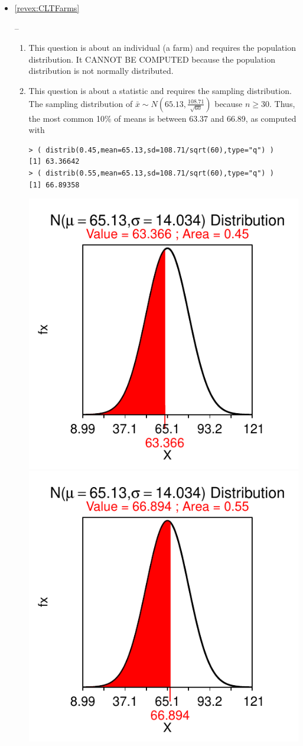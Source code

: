 \documentclass[10pt,openany]{book}\usepackage[]{graphicx}\usepackage[]{color}
\makeatletter
\newenvironment{kframe}{%
 \def\at@end@of@kframe{}%
 \ifinner\ifhmode%
  \def\at@end@of@kframe{\end{minipage}}%
  \begin{minipage}{\columnwidth}%
 \fi\fi%
 \def\FrameCommand##1{\hskip\@totalleftmargin \hskip-\fboxsep
 \colorbox{shadecolor}{##1}\hskip-\fboxsep
     \hskip-\linewidth \hskip-\@totalleftmargin \hskip\columnwidth}%
 \MakeFramed {\advance\hsize-\width
   \@totalleftmargin\z@ \linewidth\hsize
   \@setminipage}}%
 {\par\unskip\endMakeFramed%
 \at@end@of@kframe}
\newenvironment{knitrout}{}{} %
\makeatother
\begin{document}
\begin{itemize}
\begin{enumerate}
\begin{knitrout}
\end{knitrout}
    \end{enumerate}
  \item \hypertarget{ans:CLTFarms}{\ref{revex:CLTFarms}} --
    \begin{enumerate}
       \item This question is about an individual (a farm) and requires the population distribution. It CANNOT BE COMPUTED because the population distribution is not normally distributed.
       \item This question is about a statistic and requires the sampling distribution.  The sampling distribution of $\bar{x}\sim N(65.13,\frac{108.71}{\sqrt{60}})$ because $n \geq 30$.  Thus, the most common 10\% of means is between 63.37 and 66.89, as computed with
\begin{knitrout}
\color{fgcolor}\begin{kframe}
\begin{verbatim}
> ( distrib(0.45,mean=65.13,sd=108.71/sqrt(60),type="q") )
[1] 63.36642
> ( distrib(0.55,mean=65.13,sd=108.71/sqrt(60),type="q") )
[1] 66.89358
\end{verbatim}
\end{kframe}

{\centering \includegraphics[width=.4\linewidth]{Figs/unnamed-chunk-320-1} 
\includegraphics[width=.4\linewidth]{Figs/unnamed-chunk-320-2} 

}




\end{knitrout}
\end{enumerate}
\end{itemize}
\end{document}
